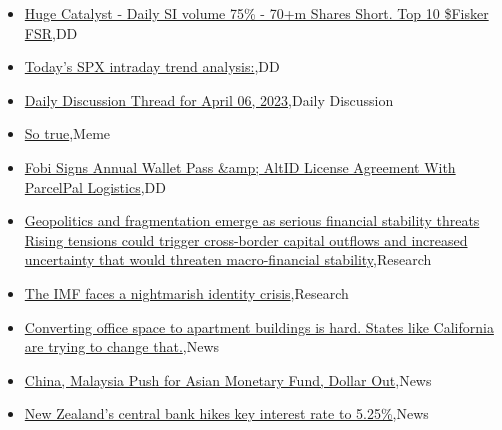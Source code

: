 \documentclass{article}%
\begin{document}
%
\begin{itemize}%
\item%
\href{https://reddit.com/r/wallstreetbets/comments/12dj6am/huge\_catalyst\_daily\_si\_volume\_75\_70m\_shares\_short/}{Huge Catalyst - Daily SI volume 75\% - 70+m Shares Short. Top 10 \$Fisker FSR},DD%
\item%
\href{https://reddit.com/r/wallstreetbets/comments/12dj2xv/todays\_spx\_intraday\_trend\_analysis/}{Today's SPX intraday trend analysis:},DD%
\item%
\href{https://reddit.com/r/wallstreetbets/comments/12df5pf/daily\_discussion\_thread\_for\_april\_06\_2023/}{Daily Discussion Thread for April 06, 2023},Daily Discussion%
\item%
\href{https://reddit.com/r/wallstreetbets/comments/12deili/so\_true/}{So true},Meme%
\item%
\href{https://reddit.com/r/Baystreetbets/comments/12ckqew/fobi\_signs\_annual\_wallet\_pass\_altid\_license/}{Fobi Signs Annual Wallet Pass \&amp; AltID License Agreement With ParcelPal Logistics},DD%
\item%
\href{https://reddit.com/r/Economics/comments/12cqde1/geopolitics\_and\_fragmentation\_emerge\_as\_serious/}{Geopolitics and fragmentation emerge as serious financial stability threats  Rising tensions could trigger cross-border capital outflows and increased uncertainty that would threaten macro-financial stability},Research%
\item%
\href{https://reddit.com/r/Economics/comments/12cms58/the\_imf\_faces\_a\_nightmarish\_identity\_crisis/}{The IMF faces a nightmarish identity crisis},Research%
\item%
\href{https://reddit.com/r/Economics/comments/12cbzyc/converting\_office\_space\_to\_apartment\_buildings\_is/}{Converting office space to apartment buildings is hard. States like California are trying to change that.},News%
\item%
\href{https://reddit.com/r/Economics/comments/12cbemq/china\_malaysia\_push\_for\_asian\_monetary\_fund/}{China, Malaysia Push for Asian Monetary Fund, Dollar Out},News%
\item%
\href{https://reddit.com/r/Economics/comments/12c80p4/new\_zealands\_central\_bank\_hikes\_key\_interest\_rate/}{New Zealand's central bank hikes key interest rate to 5.25\%},News%
\end{itemize}%
\end{document}
